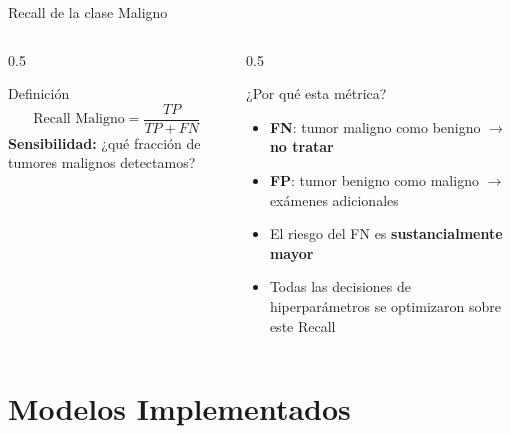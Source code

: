 \documentclass[10pt,aspectratio=169]{beamer}
\begin{document}
\begin{frame}{Recall de la clase Maligno}
\begin{columns}
\begin{column}{0.5\textwidth}
\begin{block}{Definición}
\begin{equation*}
\text{Recall Maligno} = \frac{TP}{TP + FN}
\end{equation*}
\textbf{Sensibilidad:} ¿qué fracción de tumores malignos detectamos?
\end{block}
\end{column}

\begin{column}{0.5\textwidth}
\begin{alertblock}{¿Por qué esta métrica?}
\begin{itemize}
  \item \textbf{FN}: tumor maligno como benigno $\rightarrow$ \textbf{no tratar}
  \item \textbf{FP}: tumor benigno como maligno $\rightarrow$ exámenes adicionales
  \item El riesgo del FN es \textbf{sustancialmente mayor}
  \item Todas las decisiones de hiperparámetros se optimizaron sobre este Recall
\end{itemize}
\end{alertblock}
\end{column}
\end{columns}
\end{frame}

\section{Modelos Implementados}
\end{document}

